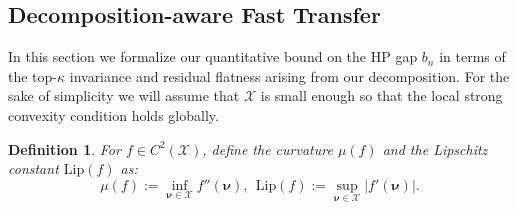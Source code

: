 \documentclass{article} %
\newtheorem{definition}{Definition}
\newcommand{\bhp}{\bm{\nu}}                       %
\newcommand{\searchspace}{\mathcal{X}}            %
\newcommand{\hptrunc}{\kappa}
\newcommand{\Lip}{\mathrm{Lip}}
\begin{document}
\bigskip 

\subsection{Decomposition-aware Fast Transfer}\label{app:fast_transfer}
In this section we formalize our quantitative bound on the HP gap $b_n$ in terms of the top-$\hptrunc$ invariance and residual flatness arising from our decomposition. For the sake of simplicity we will assume that $\searchspace$ is small enough so that the local strong convexity condition holds globally.
 \begin{definition}\label{def:curvature}
     For $f \in C^2(\searchspace)$, define the curvature $\mu(f)$ and the Lipschitz constant $\Lip(f)$ as:
\[
\mu(f) := \inf_{\bhp \in \searchspace} f''(\bhp),~~\Lip(f) := \sup_{\bhp \in \searchspace} |f'(\bhp)|.
\]
 \end{definition}
\end{document}
